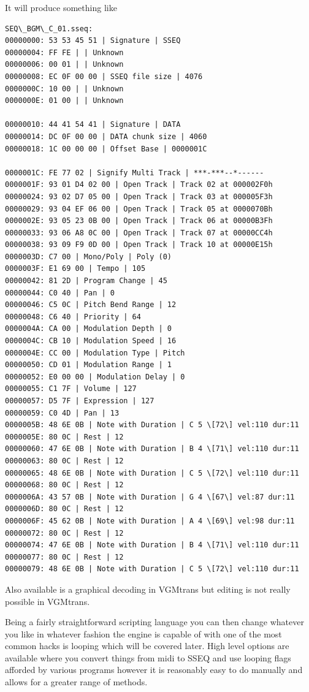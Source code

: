 \documentclass[
]{book}
\begin{document}
It will produce something like

\begin{verbatim}
SEQ\_BGM\_C_01.sseq:   
00000000: 53 53 45 51 | Signature | SSEQ   
00000004: FF FE | | Unknown   
00000006: 00 01 | | Unknown   
00000008: EC 0F 00 00 | SSEQ file size | 4076   
0000000C: 10 00 | | Unknown   
0000000E: 01 00 | | Unknown   
  
00000010: 44 41 54 41 | Signature | DATA   
00000014: DC 0F 00 00 | DATA chunk size | 4060   
00000018: 1C 00 00 00 | Offset Base | 0000001C   
  
0000001C: FE 77 02 | Signify Multi Track | ***-***--*------   
0000001F: 93 01 D4 02 00 | Open Track | Track 02 at 000002F0h   
00000024: 93 02 D7 05 00 | Open Track | Track 03 at 000005F3h   
00000029: 93 04 EF 06 00 | Open Track | Track 05 at 0000070Bh   
0000002E: 93 05 23 0B 00 | Open Track | Track 06 at 00000B3Fh   
00000033: 93 06 A8 0C 00 | Open Track | Track 07 at 00000CC4h   
00000038: 93 09 F9 0D 00 | Open Track | Track 10 at 00000E15h   
0000003D: C7 00 | Mono/Poly | Poly (0)   
0000003F: E1 69 00 | Tempo | 105   
00000042: 81 2D | Program Change | 45   
00000044: C0 40 | Pan | 0   
00000046: C5 0C | Pitch Bend Range | 12   
00000048: C6 40 | Priority | 64   
0000004A: CA 00 | Modulation Depth | 0   
0000004C: CB 10 | Modulation Speed | 16   
0000004E: CC 00 | Modulation Type | Pitch   
00000050: CD 01 | Modulation Range | 1   
00000052: E0 00 00 | Modulation Delay | 0   
00000055: C1 7F | Volume | 127   
00000057: D5 7F | Expression | 127   
00000059: C0 4D | Pan | 13   
0000005B: 48 6E 0B | Note with Duration | C 5 \[72\] vel:110 dur:11   
0000005E: 80 0C | Rest | 12   
00000060: 47 6E 0B | Note with Duration | B 4 \[71\] vel:110 dur:11   
00000063: 80 0C | Rest | 12   
00000065: 48 6E 0B | Note with Duration | C 5 \[72\] vel:110 dur:11   
00000068: 80 0C | Rest | 12   
0000006A: 43 57 0B | Note with Duration | G 4 \[67\] vel:87 dur:11   
0000006D: 80 0C | Rest | 12   
0000006F: 45 62 0B | Note with Duration | A 4 \[69\] vel:98 dur:11   
00000072: 80 0C | Rest | 12   
00000074: 47 6E 0B | Note with Duration | B 4 \[71\] vel:110 dur:11   
00000077: 80 0C | Rest | 12   
00000079: 48 6E 0B | Note with Duration | C 5 \[72\] vel:110 dur:11
\end{verbatim}

Also available is a graphical decoding in VGMtrans but editing is not really possible in VGMtrans.

Being a fairly straightforward scripting language you can then change whatever you like in whatever fashion the engine is capable of with one of the most common hacks is looping which will be covered later. High level options are available where you convert things from midi to SSEQ and use looping flags afforded by various programs however it is reasonably easy to do manually and allows for a greater range of methods.
\end{document}
